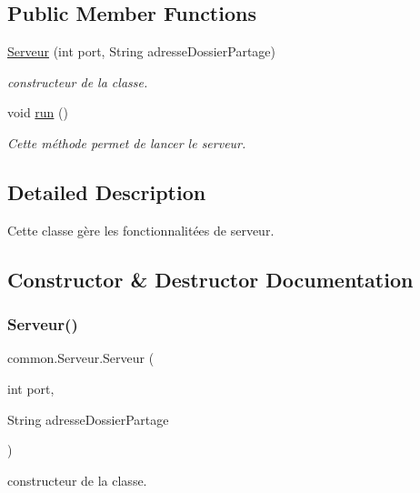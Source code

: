 \subsection*{Public Member Functions}
\begin{DoxyCompactItemize}
\item 
\hyperlink{classcommon_1_1Serveur_aef95775f670ec2ecd40e72111b125889}{Serveur} (int port, String adresse\+Dossier\+Partage)
\begin{DoxyCompactList}\small\item\em constructeur de la classe. \end{DoxyCompactList}\item 
void \hyperlink{classcommon_1_1Serveur_a14bedaf947acad1ebd395abf548b2a98}{run} ()
\begin{DoxyCompactList}\small\item\em Cette méthode permet de lancer le serveur. \end{DoxyCompactList}\end{DoxyCompactItemize}


\subsection{Detailed Description}
Cette classe gère les fonctionnalitées de serveur. 

\subsection{Constructor \& Destructor Documentation}
\mbox{\label{classcommon_1_1Serveur_aef95775f670ec2ecd40e72111b125889}} 
\subsubsection{\texorpdfstring{Serveur()}{Serveur()}}
{\footnotesize\ttfamily common.\+Serveur.\+Serveur (\begin{DoxyParamCaption}\item[{int}]{port,  }\item[{String}]{adresse\+Dossier\+Partage }\end{DoxyParamCaption})\hspace{0.3cm}{\ttfamily [inline]}}



constructeur de la classe. 


